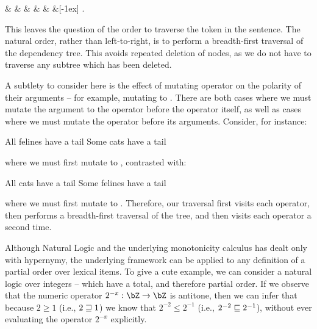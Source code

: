 \begin{center}
\begin{dependency}[text only label, label style={above}]
  \begin{deptext}[column sep=-0.00cm]
     \&  \&  \& 
       \&  \&  \&[-1ex] .\\
  \end{deptext}
\end{dependency}
\end{center}

This leaves the question of the order to traverse the token in the sentence.
The natural order, rather than left-to-right, is to perform a breadth-first
  traversal of the dependency tree.
This avoids repeated deletion of nodes, as we do not have to traverse any
  subtree which has been deleted.

A subtlety to consider here is the effect of mutating operator on the
  polarity of their arguments -- for example, mutating  to
  .
There are both cases where we must mutate the argument to the operator before
  the operator itself, as well as cases where we must mutate the operator
  before its arguments.
Consider, for instance:

\entailmentExample
{All felines have a tail}
{Some cats have a tail}

\noindent where we must first mutate  to , contrasted with:

\entailmentExample
{All cats have a tail}
{Some felines have a tail}

\noindent where we must first mutate  to .
Therefore, our traversal first visits each operator, then performs a breadth-first
  traversal of the tree, and then visits each operator a second time.

%
%
Although Natural Logic and the underlying monotonicity calculus has 
  dealt only with hypernymy, the underlying framework
  can be applied to any definition of a partial order over lexical items.
To give a cute example, we can consider a natural logic over integers \cite{key:2014icard-natlog} 
  -- which have a total, and therefore partial order.
If we observe that the numeric operator $2^{-x} : \bZ \rightarrow \bZ$ is
  antitone, then we can infer that because $2 \geq 1$ (i.e., $2 \sqsupseteq 1$)
  we know that $2^{-2} \leq 2^{-1}$ (i.e., $2^{-2} \sqsubseteq 2^{-1}$), without
  ever evaluating the operator $2^{-x}$ explicitly.

